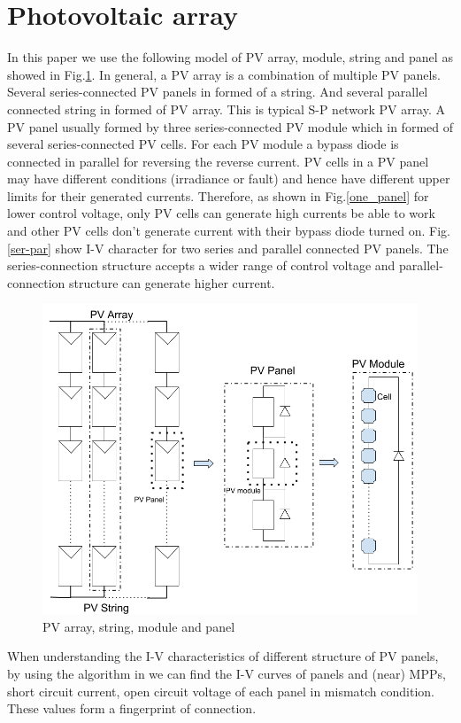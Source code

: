 \documentclass[conference]{IEEEtran}
\begin{document}
\section{Photovoltaic array}\label{Sec2}
In this paper we use the following model of PV array, module, string and panel as showed in Fig.\ref{model}. In general, a PV array is a combination of multiple PV panels. Several series-connected PV panels in formed of a string. And several parallel connected string in formed of PV array. This is typical S-P network PV array. A PV panel usually formed by three series-connected PV module which in formed of several series-connected PV cells. For each PV module a bypass diode is connected in parallel for reversing the reverse current. PV cells in a PV panel may have different conditions (irradiance or fault) and hence have different  upper limits for their generated currents. Therefore, as shown in Fig.\ref{one_panel} for lower control voltage, only PV cells can generate high currents be able to work and other PV cells don't generate current with their bypass diode turned on. Fig.\ref{ser-par} show I-V character for two series and parallel connected PV panels. The series-connection structure accepts a wider range of control voltage and parallel-connection structure can generate higher current.
\begin{figure}
    \centering
    \includegraphics[width=0.8\linewidth]{module.png}
    \caption{PV array, string, module and panel}
    \label{model}
\end{figure}
When understanding the I-V characteristics of different structure of PV panels, by using the algorithm in \cite{carotenuto2014online} we can find the I-V curves of panels and (near) MPPs, short circuit current, open circuit voltage of each panel in mismatch condition. These values form a fingerprint of connection.
\end{document}
